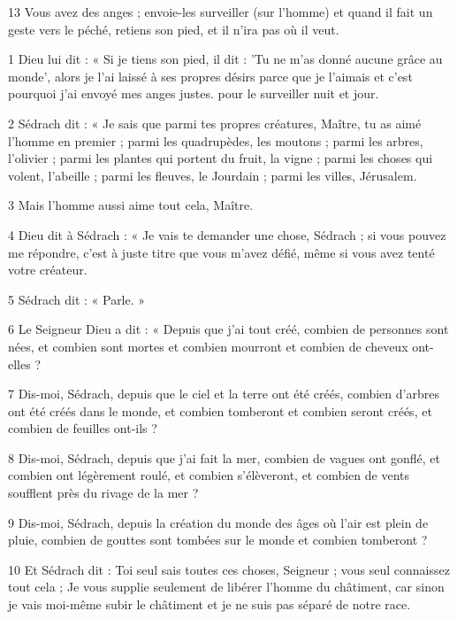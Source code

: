 \par 13 Vous avez des anges ; envoie-les surveiller (sur l'homme) et quand il fait un geste vers le péché, retiens son pied, et il n’ira pas où il veut.


\par 1 Dieu lui dit : « Si je tiens son pied, il dit : 'Tu ne m'as donné aucune grâce au monde', alors je l'ai laissé à ses propres désirs parce que je l'aimais et c'est pourquoi j'ai envoyé mes anges justes. pour le surveiller nuit et jour.

\par 2 Sédrach dit : « Je sais que parmi tes propres créatures, Maître, tu as aimé l'homme en premier ; parmi les quadrupèdes, les moutons ; parmi les arbres, l'olivier ; parmi les plantes qui portent du fruit, la vigne ; parmi les choses qui volent, l'abeille ; parmi les fleuves, le Jourdain ; parmi les villes, Jérusalem.

\par 3 Mais l’homme aussi aime tout cela, Maître.

\par 4 Dieu dit à Sédrach : « Je vais te demander une chose, Sédrach ; si vous pouvez me répondre, c’est à juste titre que vous m’avez défié, même si vous avez tenté votre créateur.

\par 5 Sédrach dit : « Parle. »

\par 6 Le Seigneur Dieu a dit : « Depuis que j'ai tout créé, combien de personnes sont nées, et combien sont mortes et combien mourront et combien de cheveux ont-elles ?

\par 7 Dis-moi, Sédrach, depuis que le ciel et la terre ont été créés, combien d'arbres ont été créés dans le monde, et combien tomberont et combien seront créés, et combien de feuilles ont-ils ?

\par 8 Dis-moi, Sédrach, depuis que j'ai fait la mer, combien de vagues ont gonflé, et combien ont légèrement roulé, et combien s'élèveront, et combien de vents soufflent près du rivage de la mer ?

\par 9 Dis-moi, Sédrach, depuis la création du monde des âges où l'air est plein de pluie, combien de gouttes sont tombées sur le monde et combien tomberont ?

\par 10 Et Sédrach dit : Toi seul sais toutes ces choses, Seigneur ; vous seul connaissez tout cela ; Je vous supplie seulement de libérer l'homme du châtiment, car sinon je vais moi-même subir le châtiment et je ne suis pas séparé de notre race.

